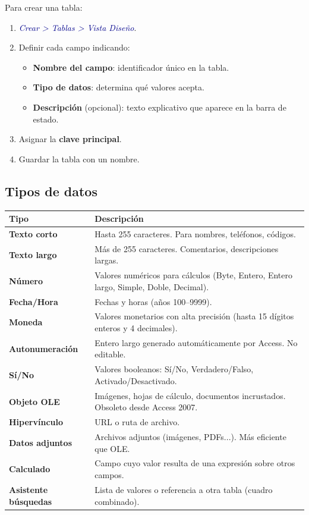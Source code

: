 \documentclass[12pt,a4paper]{article}
\newcommand{\menu}[1]{\textit{\textcolor{darkblue}{#1}}}
\begin{document}
Para crear una tabla:
\begin{enumerate}
  \item \menu{Crear > Tablas > Vista Diseño}.
  \item Definir cada campo indicando:
    \begin{itemize}
      \item \textbf{Nombre del campo}: identificador único en la tabla.
      \item \textbf{Tipo de datos}: determina qué valores acepta.
      \item \textbf{Descripción} (opcional): texto explicativo que aparece en la barra de estado.
    \end{itemize}
  \item Asignar la \textbf{clave principal}.
  \item Guardar la tabla con un nombre.
\end{enumerate}

\subsection{Tipos de datos}

\begin{center}
\renewcommand{\arraystretch}{1.3}
\begin{tabular}{>{\bfseries\color{darkblue}}p{3.5cm} p{9cm}}
\toprule
Tipo & Descripción \\
\midrule
Texto corto & Hasta 255 caracteres. Para nombres, teléfonos, códigos. \\
Texto largo & Más de 255 caracteres. Comentarios, descripciones largas. \\
Número & Valores numéricos para cálculos (Byte, Entero, Entero largo, Simple, Doble, Decimal). \\
Fecha/Hora & Fechas y horas (años 100--9999). \\
Moneda & Valores monetarios con alta precisión (hasta 15 dígitos enteros y 4 decimales). \\
Autonumeración & Entero largo generado automáticamente por Access. No editable. \\
Sí/No & Valores booleanos: Sí/No, Verdadero/Falso, Activado/Desactivado. \\
Objeto OLE & Imágenes, hojas de cálculo, documentos incrustados. Obsoleto desde Access 2007. \\
Hipervínculo & URL o ruta de archivo. \\
Datos adjuntos & Archivos adjuntos (imágenes, PDFs...). Más eficiente que OLE. \\
Calculado & Campo cuyo valor resulta de una expresión sobre otros campos. \\
Asistente búsquedas & Lista de valores o referencia a otra tabla (cuadro combinado). \\
\bottomrule
\end{tabular}
\end{center}
\end{document}
